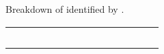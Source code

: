 \begin{paperTable}
    \centering
    \caption{Breakdown of identified  by \srcCat{}.}
    \label{tab:discrepCats}
    \begin{tabularx}{\linewidth}{|s|*{6}{CC|}t|}
        \hline
                          &  &  &  &  &  &  &                                                                                                                                                                                  \\
        \thead{\srcCat{}} &                           &                           &                           &                           &                            &                           &             &             &             &              &              &              &            \\
        \hline
        \stds{}           &                  &                  &                  &                  &                   &                  &    &    &    &    &    &    &    \\
        \metas{}          &                 &                 &                 &                 &                  &                 &   &   &   &   &   &   &   \\
        \texts{}          &                 &                 &                 &                 &                  &                 &   &   &   &   &   &   &   \\

\end{tabularx}
\end{paperTable}

